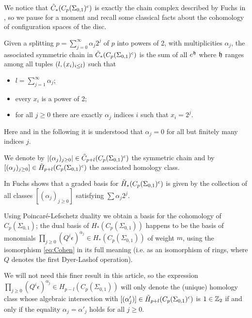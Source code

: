 We notice that $\tilde{C}_*(C_p(\Sigma_{0,1})^c)$ is exactly the chain complex described by Fuchs in
\cite{Fuchs:CohomBraidModtwo}, so we pause for a moment and
recall some classical facts about the cohomology of configuration
spaces of the disc.
\begin{defn}
\label{defn:symchain}
Given a splitting $p=\sum_{j=0}^{\infty}\alpha_j2^j$ of $p$ into powers of 2, with multiplicities $\alpha_j$,
the associated symmetric chain in $\tilde{C}_*(C_p(\Sigma_{0,1})^c)$
is the sum of all $e^{\mathfrak{h}}$ where $\mathfrak{h}$ ranges among all tuples
$\left(l,(x_i)_{i\leq l}\right)$ such that
\begin{itemize}
 \item $l=\sum_{j=1}^{\infty}\alpha_j$;
 \item every $x_i$ is a power of 2;
 \item for all $j\geq 0$ there are exactly $\alpha_j$ indices $i$ such that $x_i=2^j$.
\end{itemize}
Here and in the following it is understood that $\alpha_j=0$ for all but finitely many indices $j$.

We denote by $|(\alpha_j)_{j\geq 0}|\in\tilde{C}_{p+l}(C_p(\Sigma_{0,1})^c)$ the symmetric chain
and by $[(\alpha_j)_{j\geq 0}]\in\tilde{H}_{p+l}(C_p(\Sigma_{0,1})^c)$ the associated homology class.
\end{defn}
In \cite{Fuchs:CohomBraidModtwo} Fuchs shows that a graded basis for $\tilde{H}_*(C_p(\Sigma_{0,1})^c)$
is given by the collection of all classes $[(\alpha_j)_{j\geq 0}]$ satisfying $\sum\alpha_j2^j$.

Using Poincaré-Lefschetz duality we obtain a basis for the cohomology of $C_p(\Sigma_{0,1})$;
the dual basis of $H_*(C_p(\Sigma_{0,1}))$
happens to be the basis of monomials
$\prod_{j\geq 0}(Q^i\epsilon)^{\alpha_j}\in H_*(C_p(\Sigma_{0,1}))$ of weight $m$, using
the isomorphism \ref{eq:Cohen} in its full meaning (i.e. as an isomorphism of rings,
where $Q$ denotes the first Dyer-Lashof operation).


We will not need this finer result in this article, so the expression
$\prod_{j\geq 0}(Q^i\epsilon)^{\alpha_j}\in H_{p-l}(C_p(\Sigma_{0,1}))$ will only denote
the (unique) homology class whose algebraic intersection with $[(\alpha'_j)]\in\tilde{H}_{p+l}(C_p(\Sigma_{0,1})^c)$
is $1\in\mathbb{Z}_2$ if and only if the equality $\alpha_j=\alpha'_j$ holds for all $j\geq 0$.

